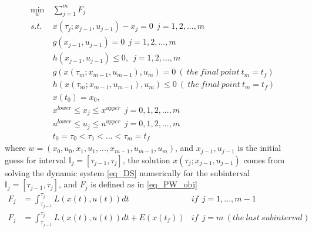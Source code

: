 \documentclass  [
  paper    = a4,
  BCOR     = 10mm,
  twoside,
  fontsize = 12pt,
  fleqn,
  toc      = bibnumbered,
  toc      = listofnumbered,
  numbers  = noendperiod,
  headings = normal,
  listof   = leveldown,
  version  = 3.03
]                                       {scrreprt}
\newcommand{\<}{\langle}
\renewcommand{\>}{\rangle}
\begin{document}
	\begin{subequations}
	\begin{align}
		\underset{w}{\text{min}}   \ &  \sum_{j=1}^{m} F_j   \label{P3_obj}   \\
		s.t. \ \ & x(\tau_j; x_{j-1}, u_{j-1}) - x_j = 0   \ \ j = 1, 2, ...,m  \label{P3_eq}  \\
		 &  g(x_{j-1}, u_{j-1}) = 0     \ \ j = 1, 2, ...,m \\
		 & h(x_{j-1}, u_{j-1}) \leq 0,    \ \ j = 1, 2, ...,m     \\
		 		&  g(x(\tau_m; x_{m-1}, u_{m-1}), u_m) = 0  \ (\ the \ final\  point\  t_m=t_f) \\
		 & h(x(\tau_m; x_{m-1}, u_{m-1}), u_m) \leq 0  \ (\ the \ final\  point \ t_m=t_f) \\
		 &  x(t_0) = x_0,  \\
		 & x^{lower} \leq x_j \leq x^{upper}  \ \ j = 0, 1, 2, ...,m  \\
		 & u^{lower} \leq u_j \leq u^{upper}  \ \ j =0,  1, 2, ...,m \\
		         &   t_0 = \tau_0 < \tau_1 < ... < \tau_m = t_f 
	\end{align}
	\label{P3_MSNLP}
\end{subequations}  
where $w = (x_0, u_0, x_1, u_1, ..., x_{m-1}, u_{m-1}, u_m) $, and $x_{j-1}, u_{j-1}$ is the initial guess  for interval $\mathbb{I}_j = [\tau_{j-1}, \tau_j]$, the  solution  $x(\tau_j; x_{j-1}, u_{j-1})$ comes from solving the dynamic system \ref{eq_DS} numerically for the subinterval $\mathbb{I}_j = [\tau_{j-1}, \tau_j]$,  and $F_j$ is defined as in \ref{eq_PW_obj}
\begin{equation}\label{eq_PW_obj}
	\begin{aligned}
		F_j &= \int_{\tau_{j-1}}^{\tau_j}L(x(t), u(t))dt   &if \ \   j= 1, ..., m-1 \\ 
		F_j  & = \int_{\tau_{j-1}}^{\tau_j}L(x(t), u(t))dt + E (x(t_f)) &if\ \   j =m  \ (the\  last\  subinterval)
	\end{aligned}
\end{equation}


\end{document}
